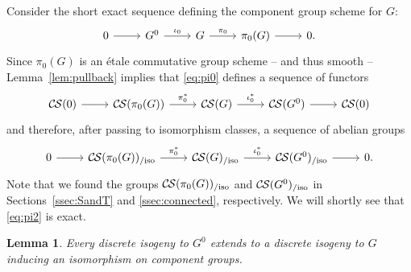 \documentclass[10pt]{amsart}
\theoremstyle{plain}
\newtheorem{lemma}[theorem]{Lemma}
\theoremstyle{definition}
\theoremstyle{remark}
\newcommand{\CS}{{\mathcal{C\hskip-0.8pt S}}}
\newcommand{\CSiso}[1]{\CS(#1)_{/\text{iso}}}
\begin{document}
Consider the short exact sequence
defining the component group scheme for $G$:
\begin{equation}\label{eq:pi0}
\begin{tikzcd}
0 \rar & G^0 \arrow{r}{\iota_0} & G \arrow{r}{\pi_0} & \pi_0(G) \rar & 0.
\end{tikzcd}
\end{equation}
Since $\pi_0(G)$ is an \'etale commutative group scheme -- and thus smooth --
Lemma~\ref{lem:pullback} implies that \eqref{eq:pi0} defines a sequence of functors
\begin{equation}\label{eq:pi1}
\begin{tikzcd}
\CS(0) \rar & \CS(\pi_0(G)) \arrow{r}{\pi_0^*} & \CS(G) \arrow{r}{\iota_0^*} & \CS(G^0) \rar & \CS(0)
\end{tikzcd}
\end{equation}
and therefore, after passing to isomorphism classes, a sequence of abelian groups
\begin{equation}\label{eq:pi2}
\begin{tikzcd}
0 \rar &
\CSiso{\pi_0(G)} \arrow{r}{\pi_0^*} & \CSiso{G} \arrow{r}{\iota_0^*} & \CSiso{G^0} \rar & 0.
\end{tikzcd}
\end{equation}
 Note that we found the groups $\CSiso{\pi_0(G)}$ and $\CSiso{G^0}$
in Sections~\ref{ssec:SandT} and \ref{ssec:connected}, respectively.
We will shortly see that \eqref{eq:pi2} is exact.


\begin{lemma}\label{lemma:ext}
Every discrete isogeny to $G^0$ extends to a discrete
isogeny to $G$ inducing an isomorphism on component groups.
\end{lemma}
\end{document}
